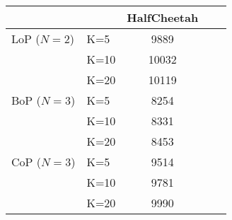 \begin{tabular}{ll|ccc}
& &\textbf{HalfCheetah}  \\\midrule
LoP ($N=2$) &K=5 & 9889  \\
&K=10 & 10032  \\
&K=20 & 10119  \\ \hline
BoP ($N=3$)&K=5 & 8254 \\
&K=10 & 8331  \\
&K=20 & 8453  \\ \hline
CoP ($N=3$)&K=5 & 9514 \\
&K=10 & 9781  \\
&K=20 & 9990  \\ \hline
\end{tabular}
